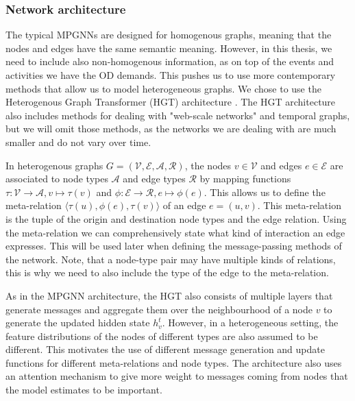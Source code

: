 \documentclass[english, 12pt, a4paper, sci, utf8, a-2b, online]{aaltothesis}
\begin{document}
\subsubsection{Network architecture}

The typical MPGNNs are designed for homogenous graphs, meaning that the nodes and edges have the same semantic meaning. However, in this thesis, we need to include also non-homogenous information, as on top of the events and activities we have the OD demands. This pushes us to use more contemporary methods that allow us to model heterogeneous graphs. We chose to use the Heterogenous Graph Transformer (HGT) architecture \cite{hgt-2020}. The HGT architecture also includes methods for dealing with "web-scale networks" and temporal graphs, but we will omit those methods, as the networks we are dealing with are much smaller and do not vary over time.

In heterogenous graphs $G = (\mathcal{V}, \mathcal{E}, \mathcal{A}, \mathcal{R})$, the nodes $v \in \mathcal{V}$ and edges $e \in \mathcal{E}$ are associated to node types $\mathcal{A}$ and edge types $\mathcal{R}$ by mapping functions $\tau: \mathcal{V} \to \mathcal{A}, v \mapsto \tau(v)$ and $\phi: \mathcal{E} \to \mathcal{R}, e \mapsto \phi(e)$. This allows us to define the meta-relation $\langle \tau(u), \phi(e), \tau(v)\rangle$ of an edge $e=(u,v)$. This meta-relation is the tuple of the origin and destination node types and the edge relation. Using the meta-relation we can comprehensively state what kind of interaction an edge expresses. This will be used later when defining the message-passing methods of the network. Note, that a node-type pair may have multiple kinds of relations, this is why we need to also include the type of the edge to the meta-relation.


As in the MPGNN architecture, the HGT also consists of multiple layers that generate messages and aggregate them over the neighbourhood of a node $v$ to generate the updated hidden state $h_v^t$. However, in a heterogeneous setting, the feature distributions of the nodes of different types are also assumed to be different. This motivates the use of different message generation and update functions for different meta-relations and node types. The architecture also uses an attention mechanism to give more weight to messages coming from nodes that the model estimates to be important.
\end{document}
